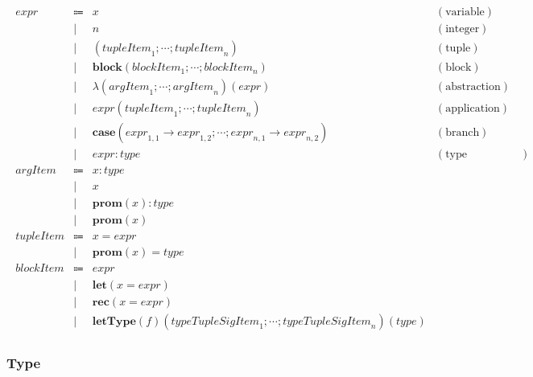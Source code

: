 \begin{align*}
  \begin{array}{rclr}
  \mathit{expr}
  & \Coloneq & x &(\text{variable}) \\
  & \mid & n &(\text{integer}) \\
  & \mid & (\mathit{tupleItem}_1; \cdots; \mathit{tupleItem}_n) &(\text{tuple}) \\
  & \mid & \mathbf{block}(\mathit{blockItem}_1; \cdots; \mathit{blockItem}_n) &(\text{block}) \\
  & \mid & \lambda(\mathit{argItem}_1; \cdots; \mathit{argItem}_n)(\mathit{expr}) &(\text{abstraction}) \\
  & \mid & \mathit{expr}(\mathit{tupleItem}_1; \cdots; \mathit{tupleItem}_n) &(\text{application}) \\
  & \mid & \mathbf{case}(\mathit{expr}_{1,1} \rightarrow \mathit{expr}_{1,2}; \cdots; \mathit{expr}_{n,1} \rightarrow \mathit{expr}_{n,2}) &(\text{branch}) \\
  & \mid & \mathit{expr}: \mathit{type} &(\text{type annotation}) \\
  \mathit{argItem}
  & \Coloneq & x: \mathit{type} \\
  & \mid & x \\
  & \mid & \mathbf{prom}(x): \mathit{type} \\
  & \mid & \mathbf{prom}(x) \\
  \mathit{tupleItem}
  & \Coloneq & x = \mathit{expr} \\
  & \mid & \mathbf{prom}(x) = \mathit{type} \\
  \mathit{blockItem}
  & \Coloneq & \mathit{expr} \\
  & \mid & \mathbf{let}(x = \mathit{expr}) \\
  & \mid & \mathbf{rec}(x = \mathit{expr}) \\
  & \mid & \mathbf{letType}(f)(\mathit{typeTupleSigItem}_1; \cdots; \mathit{typeTupleSigItem}_n)(\mathit{type})
  \end{array}
\end{align*}

\subsubsection{Type}

